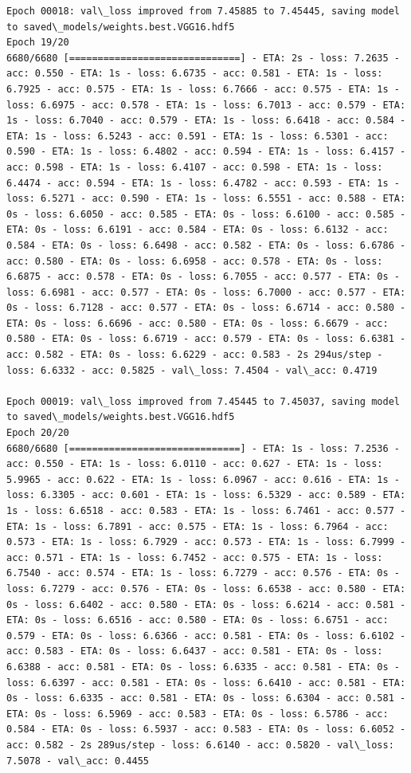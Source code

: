 \documentclass[11pt]{article}
\begin{document}
\begin{Verbatim}[commandchars=\\\{\}]
Epoch 00018: val\_loss improved from 7.45885 to 7.45445, saving model to saved\_models/weights.best.VGG16.hdf5
Epoch 19/20
6680/6680 [==============================] - ETA: 2s - loss: 7.2635 - acc: 0.550 - ETA: 1s - loss: 6.6735 - acc: 0.581 - ETA: 1s - loss: 6.7925 - acc: 0.575 - ETA: 1s - loss: 6.7666 - acc: 0.575 - ETA: 1s - loss: 6.6975 - acc: 0.578 - ETA: 1s - loss: 6.7013 - acc: 0.579 - ETA: 1s - loss: 6.7040 - acc: 0.579 - ETA: 1s - loss: 6.6418 - acc: 0.584 - ETA: 1s - loss: 6.5243 - acc: 0.591 - ETA: 1s - loss: 6.5301 - acc: 0.590 - ETA: 1s - loss: 6.4802 - acc: 0.594 - ETA: 1s - loss: 6.4157 - acc: 0.598 - ETA: 1s - loss: 6.4107 - acc: 0.598 - ETA: 1s - loss: 6.4474 - acc: 0.594 - ETA: 1s - loss: 6.4782 - acc: 0.593 - ETA: 1s - loss: 6.5271 - acc: 0.590 - ETA: 1s - loss: 6.5551 - acc: 0.588 - ETA: 0s - loss: 6.6050 - acc: 0.585 - ETA: 0s - loss: 6.6100 - acc: 0.585 - ETA: 0s - loss: 6.6191 - acc: 0.584 - ETA: 0s - loss: 6.6132 - acc: 0.584 - ETA: 0s - loss: 6.6498 - acc: 0.582 - ETA: 0s - loss: 6.6786 - acc: 0.580 - ETA: 0s - loss: 6.6958 - acc: 0.578 - ETA: 0s - loss: 6.6875 - acc: 0.578 - ETA: 0s - loss: 6.7055 - acc: 0.577 - ETA: 0s - loss: 6.6981 - acc: 0.577 - ETA: 0s - loss: 6.7000 - acc: 0.577 - ETA: 0s - loss: 6.7128 - acc: 0.577 - ETA: 0s - loss: 6.6714 - acc: 0.580 - ETA: 0s - loss: 6.6696 - acc: 0.580 - ETA: 0s - loss: 6.6679 - acc: 0.580 - ETA: 0s - loss: 6.6719 - acc: 0.579 - ETA: 0s - loss: 6.6381 - acc: 0.582 - ETA: 0s - loss: 6.6229 - acc: 0.583 - 2s 294us/step - loss: 6.6332 - acc: 0.5825 - val\_loss: 7.4504 - val\_acc: 0.4719

Epoch 00019: val\_loss improved from 7.45445 to 7.45037, saving model to saved\_models/weights.best.VGG16.hdf5
Epoch 20/20
6680/6680 [==============================] - ETA: 1s - loss: 7.2536 - acc: 0.550 - ETA: 1s - loss: 6.0110 - acc: 0.627 - ETA: 1s - loss: 5.9965 - acc: 0.622 - ETA: 1s - loss: 6.0967 - acc: 0.616 - ETA: 1s - loss: 6.3305 - acc: 0.601 - ETA: 1s - loss: 6.5329 - acc: 0.589 - ETA: 1s - loss: 6.6518 - acc: 0.583 - ETA: 1s - loss: 6.7461 - acc: 0.577 - ETA: 1s - loss: 6.7891 - acc: 0.575 - ETA: 1s - loss: 6.7964 - acc: 0.573 - ETA: 1s - loss: 6.7929 - acc: 0.573 - ETA: 1s - loss: 6.7999 - acc: 0.571 - ETA: 1s - loss: 6.7452 - acc: 0.575 - ETA: 1s - loss: 6.7540 - acc: 0.574 - ETA: 1s - loss: 6.7279 - acc: 0.576 - ETA: 0s - loss: 6.7279 - acc: 0.576 - ETA: 0s - loss: 6.6538 - acc: 0.580 - ETA: 0s - loss: 6.6402 - acc: 0.580 - ETA: 0s - loss: 6.6214 - acc: 0.581 - ETA: 0s - loss: 6.6516 - acc: 0.580 - ETA: 0s - loss: 6.6751 - acc: 0.579 - ETA: 0s - loss: 6.6366 - acc: 0.581 - ETA: 0s - loss: 6.6102 - acc: 0.583 - ETA: 0s - loss: 6.6437 - acc: 0.581 - ETA: 0s - loss: 6.6388 - acc: 0.581 - ETA: 0s - loss: 6.6335 - acc: 0.581 - ETA: 0s - loss: 6.6397 - acc: 0.581 - ETA: 0s - loss: 6.6410 - acc: 0.581 - ETA: 0s - loss: 6.6335 - acc: 0.581 - ETA: 0s - loss: 6.6304 - acc: 0.581 - ETA: 0s - loss: 6.5969 - acc: 0.583 - ETA: 0s - loss: 6.5786 - acc: 0.584 - ETA: 0s - loss: 6.5937 - acc: 0.583 - ETA: 0s - loss: 6.6052 - acc: 0.582 - 2s 289us/step - loss: 6.6140 - acc: 0.5820 - val\_loss: 7.5078 - val\_acc: 0.4455


\end{Verbatim}
\end{document}
